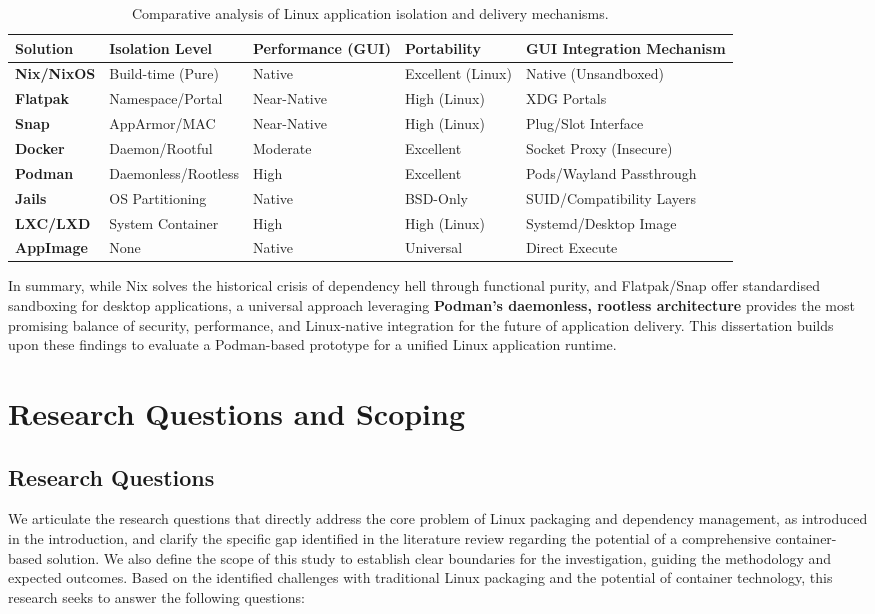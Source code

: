 \documentclass[journal,onecolumn]{IEEEtran}
\begin{document}
\begin{table}[h!]
\centering
\small
\begin{tabularx}{\textwidth}{l l l l X}
\toprule
\textbf{Solution} & \textbf{Isolation Level} & \textbf{Performance (GUI)} & \textbf{Portability} & \textbf{GUI Integration Mechanism} \\
\midrule
\textbf{Nix/NixOS} & Build-time (Pure) & Native & Excellent (Linux) & Native (Unsandboxed) \\
\textbf{Flatpak} & Namespace/Portal & Near-Native & High (Linux) & XDG Portals \\
\textbf{Snap} & AppArmor/MAC & Near-Native & High (Linux) & Plug/Slot Interface \\
\textbf{Docker} & Daemon/Rootful & Moderate & Excellent & Socket Proxy (Insecure) \\
\textbf{Podman} & Daemonless/Rootless & High & Excellent & Pods/Wayland Passthrough \\
\textbf{Jails} & OS Partitioning & Native & BSD-Only & SUID/Compatibility Layers \\
\textbf{LXC/LXD} & System Container & High & High (Linux) & Systemd/Desktop Image \\
\textbf{AppImage} & None & Native & Universal & Direct Execute \\
\bottomrule
\end{tabularx}
\caption{Comparative analysis of Linux application isolation and delivery mechanisms.}
\label{tab:comparative-analysis}
\end{table}

In summary, while Nix solves the historical crisis of dependency hell through functional purity, and Flatpak/Snap offer standardised sandboxing for desktop applications, a universal approach leveraging \textbf{Podman's daemonless, rootless architecture} provides the most promising balance of security, performance, and Linux-native integration for the future of application delivery. This dissertation builds upon these findings to evaluate a Podman-based prototype for a unified Linux application runtime.

\newpage
\section{Research Questions and Scoping}
\subsection{Research Questions}
We articulate the research questions that directly address the core problem of Linux packaging and dependency management, as introduced in the introduction, and clarify the specific gap identified in the literature review regarding the potential of a comprehensive container-based solution. We also define the scope of this study to establish clear boundaries for the investigation, guiding the methodology and expected outcomes. Based on the identified challenges with traditional Linux packaging and the potential of container technology, this research seeks to answer the following questions:
\end{document}
